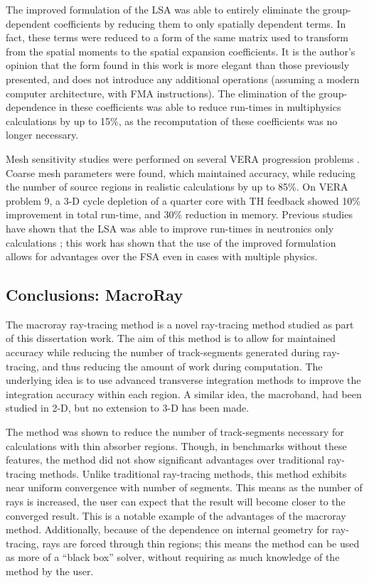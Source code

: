 {{{      The improved formulation of the \ac{LSA} was able to entirely eliminate the group-dependent coefficients by reducing them to only spatially dependent terms.
      In fact, these terms were reduced to a form of the same matrix used to transform from the spatial moments to the spatial expansion coefficients.
      It is the author's opinion that the form found in this work is more elegant than those previously presented, and does not introduce any additional operations (assuming a modern computer architecture, with \acf{FMA} instructions).
      The elimination of the group-dependence in these coefficients was able to reduce run-times in multiphysics calculations by up to 15\%, as the recomputation of these coefficients was no longer necessary.

      Mesh sensitivity studies were performed on several \ac{VERA} progression problems \cite{VERAProblems}.
      Coarse mesh parameters were found, which maintained accuracy, while reducing the number of source regions in realistic calculations by up to 85\%.
      On \ac{VERA} problem 9, a 3-D cycle depletion of a quarter core with \ac{TH} feedback showed 10\% improvement in total run-time, and 30\% reduction in memory.
      Previous studies have shown that the \ac{LSA} was able to improve run-times in neutronics only calculations \cite{Ferrer2016,Gunow2018};
      this work has shown that the use of the improved formulation allows for advantages over the \ac{FSA} even in cases with multiple physics.
    }

    \subsection{Conclusions: MacroRay}{\label{ssec:Conclusions:MacroRay}
      The macroray ray-tracing method is a novel ray-tracing method studied as part of this dissertation work.
      The aim of this method is to allow for maintained accuracy while reducing the number of track-segments generated during ray-tracing, and thus reducing the amount of work during computation.
      The underlying idea is to use advanced transverse integration methods to improve the integration accuracy within each region.
      A similar idea, the macroband, had been studied in 2-D, but no extension to 3-D has been made.

      The method was shown to reduce the number of track-segments necessary for calculations with thin absorber regions.
      Though, in benchmarks without these features, the method did not show significant advantages over traditional ray-tracing methods.
      Unlike traditional ray-tracing methods, this method exhibits near uniform convergence with number of segments.
      This means as the number of rays is increased, the user can expect that the result will become closer to the converged result.
      This is a notable example of the advantages of the macroray method.
      Additionally, because of the dependence on internal geometry for ray-tracing, rays are forced through thin regions;
        this means the method can be used as more of a ``black box'' solver, without requiring as much knowledge of the method by the user.
    }
  }

}
